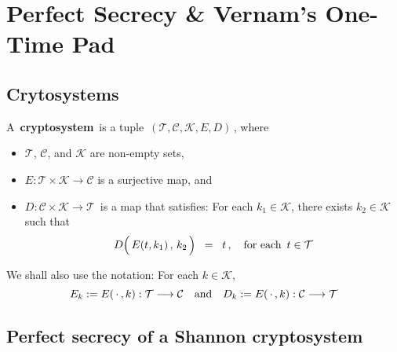 
\section{Perfect Secrecy \& Vernam's One-Time Pad}
\setcounter{theorem}{0}
\setcounter{equation}{0}

\subsection{Crytosystems}

\begin{definition}[Cryptosystem]
\mbox{}
\vskip 0.1cm
\noindent
A \,\textbf{cryptosystem}\, is a tuple \,$(\mathcal{T},\mathcal{C},\mathcal{K},E,D)$\,, where
\begin{itemize}
\item
	$\mathcal{T}$, $\mathcal{C}$, and $\mathcal{K}$ are non-empty sets,
\item
	$E : \mathcal{T} \times \mathcal{K} \longrightarrow \mathcal{C}$
	is a surjective map, and
\item
	$D : \mathcal{C} \times \mathcal{K} \longrightarrow \mathcal{T}$\,
	is a map that satisfies:
	For each $k_{1} \in \mathcal{K}$, there exists $k_{2} \in \mathcal{K}$
	such that
	\begin{equation*}
	D\!\left(\,\overset{{\color{white}.}}{E}(t,k_{1})\,,\,k_{2}\,\right) \;\; = \;\; t\,,
	\quad
	\textnormal{for each \,$t \in \mathcal{T}$}
	\end{equation*}
\end{itemize}
We shall also use the notation: For each $k \in \mathcal{K}$,
\begin{equation*}
E_{k} := E(\,\cdot\,,k) : \mathcal{T} \longrightarrow \mathcal{C}
\quad\textnormal{and}\quad
D_{k} := E(\,\cdot\,,k) : \mathcal{C} \longrightarrow \mathcal{T}
\end{equation*}
\end{definition}

\subsection{Perfect secrecy of a Shannon cryptosystem}

